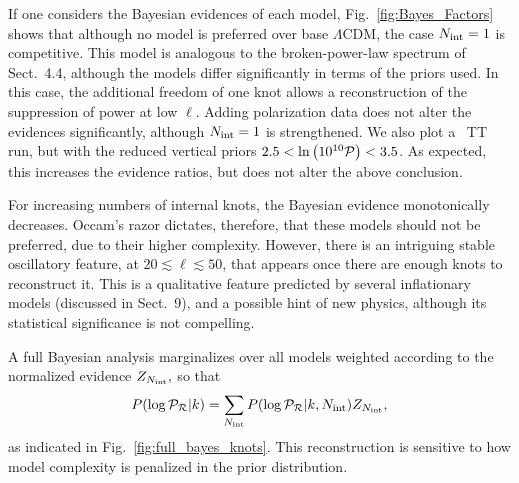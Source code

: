 If one considers the Bayesian evidences of each model, Fig.~\ref{fig:Bayes_Factors} shows that although no model is 
preferred over base $\Lambda$CDM, the case $N_\mathrm{int}=1$
is competitive. This model is analogous to the broken-power-law spectrum of
Sect.~4.4,
although the models differ significantly in terms of the priors used. In this case, the
additional freedom of one knot allows a reconstruction of the suppression of power at low $\ell$. Adding polarization data does not alter 
the evidences significantly, although $N_\mathrm{int}=1$ is strengthened. We also plot a \Planck\ TT run,
but with the reduced vertical priors ${2.5<\ln\left(10^{10}\mathcal{P}\right)<3.5}$. 
As expected, this increases the evidence ratios, but does not alter the above conclusion.

For increasing numbers of internal knots, the Bayesian evidence monotonically decreases. Occam's razor dictates,
therefore, that these models should not be preferred, due to their higher complexity. However, there is an
intriguing stable oscillatory feature, at $20\lesssim\ell\lesssim50$, that appears once there are enough knots to reconstruct it.
This is a qualitative feature predicted by several inflationary models (discussed in Sect.~9),
and a possible hint of new physics, although
its statistical significance is not compelling.

A full Bayesian analysis marginalizes over all models weighted according to the normalized evidence $Z_{N_\mathrm{int}},$
so that
\begin{equation}
  P(\log\mathcal{P}_\mathcal{R}|k) = \sum\limits_{N_\mathrm{int}} P(\log\mathcal{P}_\mathcal{R}|k,N_\mathrm{int}) Z_{N_\mathrm{int}},
  \label{eqn:margPR_full}
\end{equation}
as indicated in Fig.~\ref{fig:full_bayes_knots}.
This reconstruction is sensitive to how model complexity is penalized in the prior distribution. 

